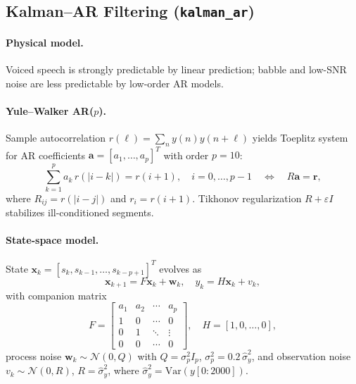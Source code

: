 \subsection{Kalman--AR Filtering (\texttt{kalman\_ar})}

\paragraph{Physical model.}
Voiced speech is strongly predictable by linear prediction; babble and low-SNR noise are less predictable by low-order AR models.

\paragraph{Yule--Walker AR($p$).}
Sample autocorrelation $r(\ell)=\sum_n y(n)y(n+\ell)$ yields Toeplitz system for AR coefficients $\mathbf{a}=[a_1,\ldots,a_p]^T$ with order $p=10$:
\begin{equation}
  \sum_{k=1}^{p} a_k\, r(|i-k|) = r(i+1), \quad i=0,\ldots,p-1
  \quad \Leftrightarrow \quad R\mathbf{a}=\mathbf{r},
  \label{eq:yule_walker}
\end{equation}
where $R_{ij}=r(|i-j|)$ and $r_i=r(i+1)$. Tikhonov regularization $R+\varepsilon I$ stabilizes ill-conditioned segments.

\paragraph{State-space model.}
State $\mathbf{x}_k = [s_k, s_{k-1},\ldots,s_{k-p+1}]^T$ evolves as
\begin{equation}
  \mathbf{x}_{k+1} = F\mathbf{x}_k + \mathbf{w}_k, \quad y_k = H\mathbf{x}_k + v_k,
  \label{eq:kalman_ss}
\end{equation}
with companion matrix
\begin{equation}
  F = \begin{bmatrix}
    a_1 & a_2 & \cdots & a_p \\
    1   & 0   & \cdots & 0 \\
    0   & 1   & \ddots & \vdots \\
    0   & 0   & \cdots & 0
  \end{bmatrix}, \quad H=[1,0,\ldots,0],
\end{equation}
process noise $\mathbf{w}_k\sim\mathcal{N}(0,Q)$ with $Q=\sigma_p^2 I_p$, $\sigma_p^2=0.2\,\hat{\sigma}_y^2$, and observation noise $v_k\sim\mathcal{N}(0,R)$, $R=\hat{\sigma}_y^2$, where $\hat{\sigma}_y^2=\mathrm{Var}(y[0:2000])$.

